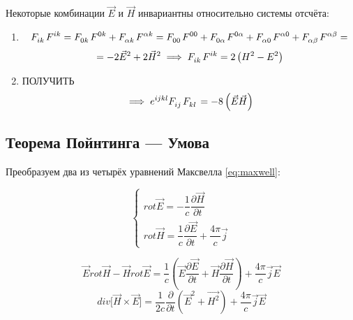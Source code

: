 \documentclass{article}
\begin{document}
Некоторые комбинации $\vec{E}$ и $\vec{H}$ инвариантны относительно системы отсчёта:

\begin{enumerate}
    \item 
        \begin{equation*}
        \tensor{F}{_i_k}\tensor{F}{^i^k}=\tensor{F}{_0_k}\tensor{F}{^0^k}+\tensor{F}{_\alpha_k}\tensor{F}{^\alpha^k}=\tensor{F}{_0_0}\tensor{F}{^0^0}+\tensor{F}{_0_\alpha}\tensor{F}{^0^\alpha}+\tensor{F}{_\alpha_0}\tensor{F}{^\alpha^0}+\tensor{F}{_\alpha_\beta}\tensor{F}{^\alpha^\beta}=
        \end{equation*}
        \begin{equation*}
        =-2\vec{E}^2+2\vec{H}^2 \implies \tensor{F}{_i_k}\tensor{F}{^i^k}=2\left(H^2-E^2\right)
        \end{equation*}
    \item ПОЛУЧИТЬ
        \begin{equation*}
            \implies \tensor{e}{^i^j^k^l}\tensor{F}{_i_j}\tensor{F}{_k_l}=-8\left(\vec{E}\vec{H}\right)
        \end{equation*}
\end{enumerate}

\subsection{Теорема Пойнтинга --- Умова}

Преобразуем два из четырёх уравнений Максвелла \eqref{eq:maxwell}:

\begin{equation*}
    \begin{cases}
    rot\vec{E}=-\dfrac{1}{c}\dfrac{\partial\vec{H}}{\partial t}\\
    rot\vec{H}=\dfrac{1}{c}\dfrac{\partial\vec{E}}{\partial t}+\dfrac{4\pi}{c}\vec{j}
    \end{cases}
\end{equation*}

\begin{equation*}
    \vec{E}rot\vec{H}-\vec{H}rot\vec{E}=\frac{1}{c}\left(\vec{E}\frac{\partial\vec{E}}{\partial t}+\vec{H}\frac{\partial\vec{H}}{\partial t}\right)+\frac{4\pi}{c}\vec{j}\vec{E}
\end{equation*}
\begin{equation*}
    div\lbrack\vec{H}\times\vec{E}\rbrack=\frac{1}{2c}\frac{\partial}{\partial t}\left(\vec{E}^2+\vec{H^2}\right)+\frac{4\pi}{c}\vec{j}\vec{E}
\end{equation*}
\end{document}

